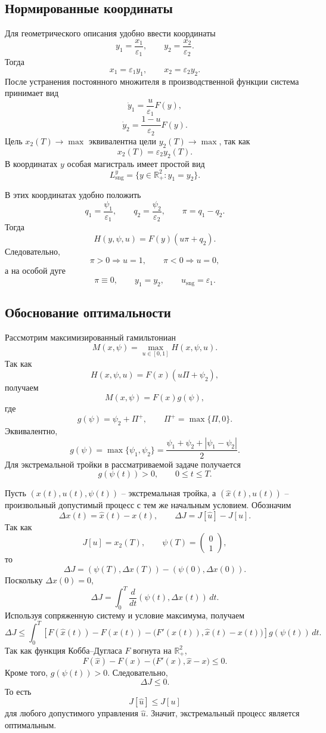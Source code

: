 \documentclass[12pt,a4paper]{article}
\newcommand{\R}{\mathbb{R}}
\newcommand{\eps}{\varepsilon}
\newcommand{\sng}{\mathrm{sng}}
\begin{document}
\subsection{Нормированные координаты}

Для геометрического описания удобно ввести координаты
\[
    y_1=\frac{x_1}{\eps_1},
    \qquad
    y_2=\frac{x_2}{\eps_2}.
\]
Тогда
\[
    x_1=\eps_1y_1,
    \qquad
    x_2=\eps_2y_2.
\]
После устранения постоянного множителя в производственной функции система принимает вид
\[
    \dot y_1=\frac{u}{\eps_1}F(y),
\]
\[
    \dot y_2=\frac{1-u}{\eps_2}F(y).
\]
Цель \(x_2(T)\to\max\) эквивалентна цели \(y_2(T)\to\max\), так как
\[
    x_2(T)=\eps_2y_2(T).
\]
В координатах \(y\) особая магистраль имеет простой вид
\[
    L_{\sng}^y=\{y\in\R^2_+: y_1=y_2\}.
\]

В этих координатах удобно положить
\[
    q_1=\frac{\psi_1}{\eps_1},
    \qquad
    q_2=\frac{\psi_2}{\eps_2},
    \qquad
    \pi=q_1-q_2.
\]
Тогда
\[
    H(y,\psi,u)=F(y)(u\pi+q_2).
\]
Следовательно,
\[
    \pi>0\Rightarrow u=1,
    \qquad
    \pi<0\Rightarrow u=0,
\]
а на особой дуге
\[
    \pi\equiv0,
    \qquad
    y_1=y_2,
    \qquad
    u_{\sng}=\eps_1.
\]

\subsection{Обоснование оптимальности}

Рассмотрим максимизированный гамильтониан
\[
    M(x,\psi)=\max_{u\in[0,1]}H(x,\psi,u).
\]
Так как
\[
    H(x,\psi,u)=F(x)(u\Pi+\psi_2),
\]
получаем
\[
    M(x,\psi)=F(x)g(\psi),
\]
где
\[
    g(\psi)=\psi_2+\Pi^+,
    \qquad
    \Pi^+=\max\{\Pi,0\}.
\]
Эквивалентно,
\[
    g(\psi)=\max\{\psi_1,\psi_2\}
    =\frac{\psi_1+\psi_2+|\psi_1-\psi_2|}{2}.
\]
Для экстремальной тройки в рассматриваемой задаче получается
\[
    g(\psi(t))>0,
    \qquad
    0\le t\le T.
\]

Пусть \((x(t),u(t),\psi(t))\) -- экстремальная тройка, а \((\widehat x(t),\widehat u(t))\) -- произвольный допустимый процесс с тем же начальным условием. Обозначим
\[
    \Delta x(t)=\widehat x(t)-x(t),
    \qquad
    \Delta J=J[\widehat u]-J[u].
\]
Так как
\[
    J[u]=x_2(T),
    \qquad
    \psi(T)=
    \begin{pmatrix}
        0\\1
    \end{pmatrix},
\]
то
\[
    \Delta J=(\psi(T),\Delta x(T))-(\psi(0),\Delta x(0)).
\]
Поскольку \(\Delta x(0)=0\),
\[
    \Delta J=\int_0^T \frac{d}{dt}(\psi(t),\Delta x(t))\,dt.
\]
Используя сопряженную систему и условие максимума, получаем
\[
    \Delta J\le
    \int_0^T
    \left[ F(\widehat x(t))-F(x(t))-\bigl(F'(x(t)),\widehat x(t)-x(t)\bigr)\right]
    g(\psi(t))\,dt.
\]
Так как функция Кобба--Дугласа \(F\) вогнута на \(\R^2_+\),
\[
    F(\widehat x)-F(x)-\bigl(F'(x),\widehat x-x\bigr)\le0.
\]
Кроме того, \(g(\psi(t))>0\). Следовательно,
\[
    \Delta J\le0.
\]
То есть
\[
    J[\widehat u]\le J[u]
\]
для любого допустимого управления \(\widehat u\). Значит, экстремальный процесс является оптимальным.
\end{document}

